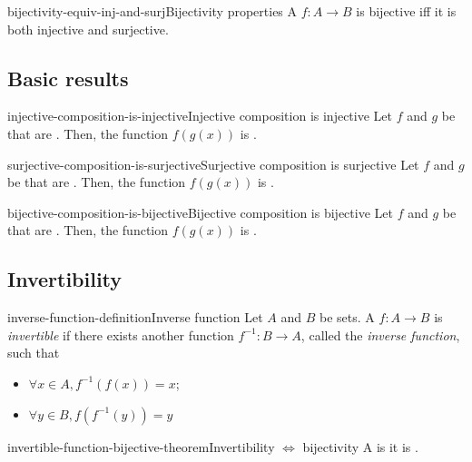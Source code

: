 \documentclass[preview]{standalone}
\begin{document}
\begin{snippetcorollary}{bijectivity-equiv-inj-and-surj}{Bijectivity properties}
    A \function \(f \colon A\to B\) is bijective iff it is both injective and surjective.
\end{snippetcorollary}

\subsection{Basic results}

\begin{snippetproposition}{injective-composition-is-injective}{Injective composition is injective}
    Let \(f\) and \(g\) be \function[functions] that are \injective.
    Then, the function \(f(g(x))\) is \injective.
\end{snippetproposition}

\begin{snippetproposition}{surjective-composition-is-surjective}{Surjective composition is surjective}
    Let \(f\) and \(g\) be \function[functions] that are \surjective.
    Then, the function \(f(g(x))\) is \surjective.
\end{snippetproposition}

\begin{snippetproposition}{bijective-composition-is-bijective}{Bijective composition is bijective}
    Let \(f\) and \(g\) be \function[functions] that are \bijective.
    Then, the function \(f(g(x))\) is \bijective.
\end{snippetproposition}

\subsection{Invertibility}

\begin{snippetdefinition}{inverse-function-definition}{Inverse function}
    Let \(A\) and \(B\) be sets. A \function \(f\colon A \to B\) is \textit{invertible}
    if there exists another function \(f^{-1}\colon B \to A\), called the \textit{inverse function},
    such that
    \begin{itemize}
        \item \(\forall x \in A, f^{-1}(f(x)) = x\);
        \item \(\forall y \in B, f(f^{-1}(y)) = y\)
    \end{itemize}
\end{snippetdefinition}

\begin{snippettheorem}{invertible-function-bijective-theorem}{Invertibility \(\iff\) bijectivity}
    A \function is 
    \ifandonlyif it is .
\end{snippettheorem}
\end{document}
